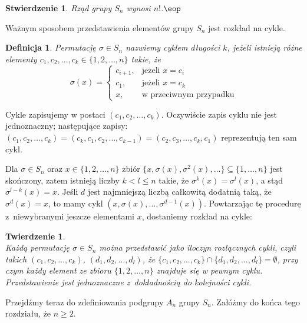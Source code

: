 \documentclass[licencjacka]{pracamgr}
\newtheorem{deff}{Definicja}[section]
\newtheorem{thh}{Twierdzenie}[section]
\newtheorem{fact}{Stwierdzenie}[section]
\begin{document}
\begin{fact}
    Rząd grupy $S_n$ wynosi $n!$.\quad$\eop$
\end{fact}

Ważnym sposobem przedstawienia elementów grupy $S_n$ jest rozkład na
cykle.

\begin{deff}
    Permutację $\sigma \in S_n$ nazwiemy \emph{cyklem długości $k$},
    jeżeli istnieją różne elementy $c_1, c_2, \ldots, c_k \in \{1, 2, \ldots, n\}$ takie, że
    $$ \sigma(x) = \left\{
                \begin{array}{ll}
                    c_{i+1}, & \textrm{jeżeli $x = c_i$}\\
                    c_1,     & \textrm{jeżeli $x = c_k$}\\
                    x,       & \textrm{w przeciwnym przypadku}
                \end{array} \right.
    $$
\end{deff}

Cykle zapisujemy w postaci $(c_1, c_2, \ldots, c_k)$. Oczywiście zapis cyklu nie jest jednoznaczny; 
następujące zapisy: $(c_1, c_2, \ldots, c_k) = (c_k, c_1, c_2, \ldots, c_{k-1}) = (c_2, c_3, \ldots, c_k,
c_1)$ reprezentują ten sam cykl.

Dla $\sigma \in S_n$ oraz $x\in\{1, 2,\ldots, n\}$ zbiór
$\{x,\sigma(x),\sigma^2(x),\ldots\}\subseteq\{1,\ldots,n\}$ jest skończony, zatem istnieją
liczby $k<l\leq n$ takie, że $\sigma^k(x)=\sigma^l(x)$, a stąd $\sigma^{l-k}(x)=x$. Jeśli $d$ jest najmniejszą
liczbą całkowitą dodatnią taką, że $\sigma^d(x)=x$, to mamy cykl $\left(x,\sigma(x),\ldots,\sigma^{d-1}(x)\right)$.
Powtarzając tę procedurę z~niewybranymi jeszcze elementami $x$, dostaniemy rozkład na cykle:

\begin{thh} $ $ \\
    Każdą permutację $\sigma \in S_n$ można przedstawić jako iloczyn rozłącznych cykli,
    czyli takich $(c_1, c_2, \ldots, c_k)$, $(d_1, d_2, \ldots, d_l)$, że $\{ c_1, c_2, \ldots, c_k \} \cap \{ d_1, d_2, \ldots, d_l \} = \emptyset$,
    przy czym każdy element ze zbioru $\{1, 2, \ldots, n\}$ znajduje się w pewnym cyklu.
    Przedstawienie jest jednoznaczne z~dokładnością do kolejności cykli.
\end{thh}

\pagebreak[2]

Przejdźmy teraz do zdefiniowania podgrupy $A_n$ grupy $S_n$. Załóżmy
do końca tego rozdziału, że $n \ge 2$.
\end{document}
